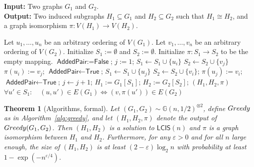 \documentclass[10pt,a4paper]{amsart}
\newtheorem{theorem}{Theorem}
\newcommand{\F}{\textsf{False}}
\newcommand{\Gnhalf}{\mathbb{G}(n,1/2)}
\newcommand{\MCS}{\mathsf{LCIS}}
\newcommand{\T}{\textsf{True}}
\newcommand{\done}{\textsf{AddedPair}}
\newcommand{\eps}{\varepsilon}
\newcommand{\greedy}{\textsc{Greedy} }
\begin{document}
\begin{algorithm}[ht!]
\textbf{Input:} Two graphs $G_{1}$ and $G_{2}$. \\ 
\textbf{Output:} Two induced subgraphs $H_{1} \subseteq G_{1}$ and $H_{2} \subseteq G_{2}$ such that $H_{1} \cong H_{2}$, and a graph isomorphism $\pi : V(H_{1}) \to V(H_{2})$.
\begin{algorithmic}[1]
    \State Let $u_1, \dots, u_n$ be an arbitrary ordering of $V(G_{1})$. 
    \State Let $v_1, \dots, v_n$ be an arbitrary ordering of $V(G_{2})$.
    \State Initialize $S_1:= \emptyset$ and $ S_{2} := \emptyset$. 
    \State Initialize $\pi : S_{1} \to S_{2}$ to be the empty mapping.
        \State $\done := \F$;
        \State $j := 1$;
        \While{$\done == \F$ and $j \leq i$}
                \State $S_{1} \gets S_{1} \cup \{ u_{i} \}$
                \State $S_{2} \gets S_{2} \cup \{ v_{j} \}$
                \State $\pi(u_{i}) := v_{j}$;
                \State $\done \gets \T$;
                \State $S_{1} \gets S_{1} \cup \{ u_{j} \}$
                \State $S_{2} \gets S_{2} \cup \{ v_{i} \}$;
                \State $\pi(u_{j}) := v_{i}$;
                \State $\done \gets \T$;
            \Else 
                \State $j \gets j+1$;
            \EndIf
        \EndWhile 
    \EndFor
    \State $H_{1} := G_{1}[S_{1}]$;
    \State $H_{2} := G_{2}[S_{2}]$;
    \State \Return $(H_{1}, H_{2}, \pi)$
\EndProcedure
\State
{}
    \State \Return $\forall u' \in S_{1}: \quad (u, u') \in E(G_1) \iff (v, \pi(u')) \in E(G_2)$
\EndProcedure
\end{algorithmic}
\caption{Greedy algorithm for finding common induced subgraphs}\label{alg:greedy}
\end{algorithm}

\begin{theorem}[Algorithms, formal]\label{thm:algs-formal}
    Let $(G_1, G_2) \sim \Gnhalf^{\otimes 2}$, define $\greedy$  as in Algorithm~\ref{alg:greedy}, 
    and let $(H_1, H_2, \pi)$ denote the output of $\greedy(G_1, G_2)$. 
    Then $(H_1, H_2)$ is a solution to $\MCS(n)$ and $\pi$ is a graph isomorphism between $H_{1}$ and $H_{2}$. 
    Furthermore, for any $\eps > 0$ and for all $n$ large enough, the size of $(H_1, H_2)$ is at least $(2 - \eps)\log_2 n$ with probability at least $1 - \exp(-n^{\eps / 4})$.
\end{theorem}
\end{document}
